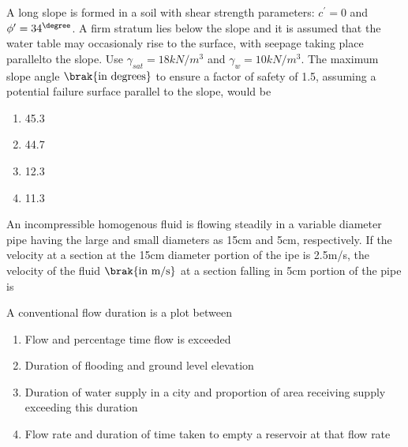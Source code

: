     \item[16.] A long slope is formed in a soil with shear strength parameters: $c^{\prime} = 0$ 
        and $\phi^{\prime} = 34^{\degree}$. A firm stratum lies below the slope and it is assumed that
        the water table may occasionaly rise to the surface, with seepage taking place parallelto the slope.
        Use $\gamma_{sat}= 18 kN/m^{3}$ and $\gamma_w = 10 kN/m^3$. The maximum slope angle $\brak{\textnormal{in degrees}}$
        to ensure a factor of safety of 1.5, assuming a potential failure surface parallel to the slope, 
        would be
        \hfill{}
        \begin{multicols}{4}

            \begin{enumerate}
                \item  45.3 \columnbreak
                \item  44.7 \columnbreak
                \item  12.3 \columnbreak
                \item  11.3
            \end{enumerate}
        \end{multicols}

    \item[17.] An incompressible homogenous fluid is flowing steadily in a variable diameter pipe
        having the large and small diameters as 15cm and 5cm, respectively. If the velocity at a
        section at the 15cm diameter portion of the ipe is 2.5m/s, the velocity of the fluid 
        $\brak{\textnormal{in m/s}}$ at a section falling in 5cm portion of the pipe is
        \hfill{}

    \item[18.] A conventional flow duration is a plot between 

        \hfill{}
        \begin{enumerate}
            \item Flow and percentage time flow is exceeded
            \item Duration of flooding and ground level elevation
            \item Duration of water supply in a city and proportion of area receiving supply exceeding
                this duration
            \item Flow rate and duration of time taken to empty a reservoir at that flow rate
        \end{enumerate}


